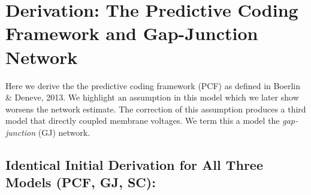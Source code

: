 \section{Derivation: The Predictive Coding Framework and Gap-Junction Network}


Here we derive the the predictive coding framework (PCF) as defined in Boerlin \& Deneve, 2013. We highlight an assumption in this model which we later show worsens the network estimate. The correction of this assumption produces a third model that directly coupled membrane voltages. We term this a model the \textit{gap-junction} (GJ) network.\\


\subsection{Identical Initial Derivation for All Three Models (PCF, GJ, SC):}

